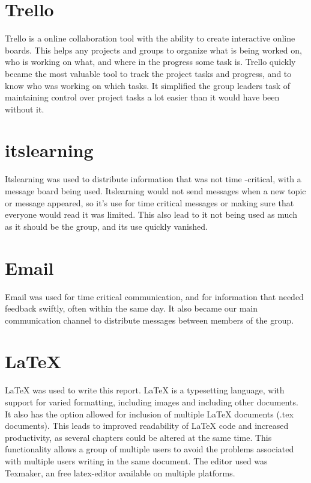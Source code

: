 \section{Trello}  

Trello \label{def:trello} is a online collaboration tool with the ability to create interactive online boards. This helps any projects and groups to organize what is being worked on, who is working on what, and where in the progress some task is. Trello quickly became the most valuable tool to track the project tasks and progress, and to know who was working on which tasks. It simplified the group leaders task of maintaining control over project tasks a lot easier than it would have been without it.


\section{itslearning}
Itslearning was used to distribute information that was not time -critical, with a message board being used. Itslearning would not send messages when a new topic or message appeared, so it's use for time critical messages or making sure that everyone would read it was limited. This also lead to it not being used as much as it should be the group, and its use quickly vanished.

\section{Email}
Email was used for time critical communication, and for information that needed feedback swiftly, often within the same day. It also became our main communication channel to distribute messages between members of the group.

\section{LaTeX}
\label{def:latex}
LaTeX was used to write this report. LaTeX is a typesetting language, with support for varied formatting, including images and including other documents. It also has the option allowed for inclusion of multiple LaTeX documents (.tex documents). This leads to improved readability of LaTeX code and increased productivity, as several chapters could be altered at the same time. This functionality allows a group of multiple users to avoid the problems associated with multiple users writing in the same document. The editor used was Texmaker, an free latex-editor available on multiple platforms.
